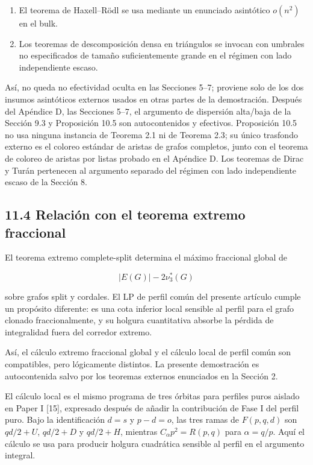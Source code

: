 \documentclass[
  11pt,
]{article}
\providecommand{\tightlist}{%
  \setlength{\itemsep}{0pt}\setlength{\parskip}{0pt}}
\begin{document}
\begin{enumerate}
\def\labelenumi{\arabic{enumi}.}
\tightlist
\item
  El teorema de Haxell--Rödl se usa mediante un enunciado asintótico
  \(o(n^2)\) en el bulk.
\item
  Los teoremas de descomposición densa en triángulos se invocan con
  umbrales no especificados de tamaño suficientemente grande en el
  régimen con lado independiente escaso.
\end{enumerate}

Así, no queda no efectividad oculta en las Secciones 5--7; proviene solo
de los dos insumos asintóticos externos usados en otras partes de la
demostración. Después del Apéndice D, las Secciones 5--7, el argumento
de dispersión alta/baja de la Sección 9.3 y Proposición 10.5 son
autocontenidos y efectivos. Proposición 10.5 no usa ninguna instancia de
Teorema 2.1 ni de Teorema 2.3; su único trasfondo externo es el coloreo
estándar de aristas de grafos completos, junto con el teorema de coloreo
de aristas por listas probado en el Apéndice D. Los teoremas de Dirac y
Turán pertenecen al argumento separado del régimen con lado
independiente escaso de la Sección 8.

\subsection{11.4 Relación con el teorema extremo
fraccional}\label{relaciuxf3n-con-el-teorema-extremo-fraccional}

El teorema extremo complete-split determina el máximo fraccional global
de

\[
|E(G)|-2\nu_3^*(G)
\]

sobre grafos split y cordales. El LP de perfil común del presente
artículo cumple un propósito diferente: es una cota inferior local
sensible al perfil para el grafo clonado fraccionalmente, y su holgura
cuantitativa absorbe la pérdida de integralidad fuera del corredor
extremo.

Así, el cálculo extremo fraccional global y el cálculo local de perfil
común son compatibles, pero lógicamente distintos. La presente
demostración es autocontenida salvo por los teoremas externos enunciados
en la Sección 2.

El cálculo local es el mismo programa de tres órbitas para perfiles
puros aislado en Paper I {[}15{]}, expresado después de añadir la
contribución de Fase I del perfil puro. Bajo la identificación \(d=s\) y
\(p-d=o\), las tres ramas de \(F(p,q,d)\) son \(qd/2+U\), \(qd/2+D\) y
\(qd/2+H\), mientras \(C_\alpha p^2=R(p,q)\) para \(\alpha=q/p\). Aquí
el cálculo se usa para producir holgura cuadrática sensible al perfil en
el argumento integral.
\end{document}
